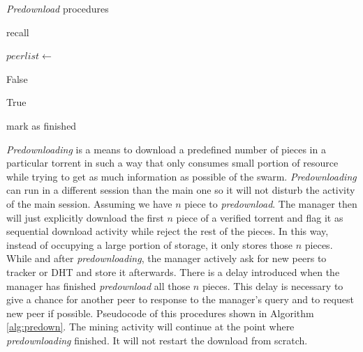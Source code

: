 \begin{algorithm}[h]
	\caption{\textit{Predownload} procedures}
	\label{alg:predown}
	\begin{algorithmic}[1]
		\State recall 
		\EndIf
		
		\State {}
		
		\State {}
		\State {}
		
		\State {}
		\EndFunction
		\Statex
		\State $peerlist \gets$ 
		\State {}
		
		\State {}
		\State \Return False
		\EndIf
		
		\State {}
		\State {}
		\State \Return True
		\EndIf
		
		\State mark as finished
		\EndIf
		\State {}
		\EndFunction		
	\end{algorithmic}
\end{algorithm}

\textit{Predownloading} is a means to download a predefined number of pieces in a particular torrent in such a way that only consumes small portion of resource while trying to get as much information as possible of the swarm. \textit{Predownloading} can run in a different session than the main one so it will not disturb the activity of the main session. Assuming we have $n$ piece to \textit{predownload}. The manager then will just explicitly download the first $n$ piece of a verified torrent and flag it as sequential download activity while reject the rest of the pieces. In this way, instead of occupying a large portion of storage, it only stores those $n$ pieces. While and after \textit{predownloading}, the manager actively ask for new peers to tracker or DHT and store it afterwards. There is a delay introduced when the manager has finished \textit{predownload} all those $n$ pieces. This delay is necessary to give a chance for another peer to response to the manager's query and to request new peer if possible. Pseudocode of this procedures shown in Algorithm \ref{alg:predown}. The mining activity will continue at the point where \textit{predownloading} finished. It will not restart the download from scratch.

